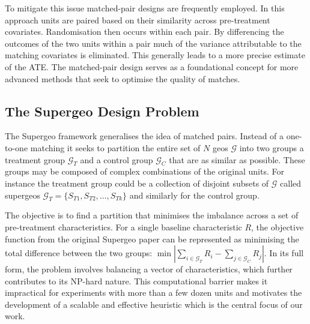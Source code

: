 \documentclass[final,3p,fleqn, 10pt]{elsarticle}
\begin{document}
    To mitigate this issue matched-pair designs are frequently employed. In this approach units are paired based on their similarity across pre-treatment covariates. Randomisation then occurs within each pair. By differencing the outcomes of the two units within a pair much of the variance attributable to the matching covariates is eliminated. This generally leads to a more precise estimate of the ATE. The matched-pair design serves as a foundational concept for more advanced methods that seek to optimise the quality of matches.

    \subsection{The Supergeo Design Problem}
    The Supergeo framework generalises the idea of matched pairs. Instead of a one-to-one matching it seeks to partition the entire set of $N$ geos $\mathcal{G}$ into two groups a treatment group $\mathcal{G}_T$ and a control group $\mathcal{G}_C$ that are as similar as possible. These groups may be composed of complex combinations of the original units. For instance the treatment group could be a collection of disjoint subsets of $\mathcal{G}$ called supergeos $\mathcal{G}_T = \{S_{T1}, S_{T2}, \dots, S_{Tk}\}$ and similarly for the control group.

    The objective is to find a partition that minimises the imbalance across a set of pre-treatment characteristics. For a single baseline characteristic $R$, the objective function from the original Supergeo paper can be represented as minimising the total difference between the two groups: $\min |\sum_{i \in \mathcal{G}_T} R_i - \sum_{j \in \mathcal{G}_C} R_j|$. In its full form, the problem involves balancing a vector of characteristics, which further contributes to its NP-hard nature. This computational barrier makes it impractical for experiments with more than a few dozen units and motivates the development of a scalable and effective heuristic which is the central focus of our work.
\end{document}
